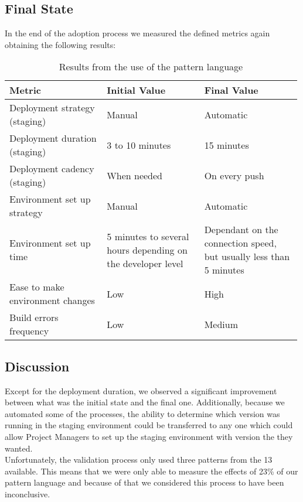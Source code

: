 			\subsection{Final State}
			In the end of the adoption process we measured the defined metrics again obtaining the following results:
			\begin{table}[h!]
				\begin{center}
					\begin{tabular}{| p{0.33\linewidth} | p{0.33\linewidth} | p{0.33\linewidth} |}
						\hline
	 					\textbf{Metric} & \textbf{Initial Value} & \textbf{Final Value}                     \\ \hline
	 					Deployment strategy (staging) 	    & Manual            & Automatic                 \\ \hline
						Deployment duration (staging) 	    & 3 to 10 minutes   & 15 minutes                \\ \hline
						Deployment cadency (staging)  	    & When needed       & On every push             \\ \hline
						Environment set up strategy		    & Manual            & Automatic                 \\ \hline
						Environment set up time 			& 5 minutes to several hours depending on the developer level  & Dependant on the connection speed, but usually less than 5 minutes  \\ \hline
						Ease to make environment changes    & Low               & High                      \\ \hline
						Build errors frequency			    & Low               & Medium                    \\ \hline
					\end{tabular}
				\end{center}
				\caption{Results from the use of the pattern language}
				\subsection{Discussion}
				Except for the deployment duration, we observed a significant improvement between what was the initial state and the final one. Additionally, because we automated some of the processes, the ability to determine which version was running in the staging environment could be transferred to any one which could allow Project Managers to set up the staging environment with version the they wanted. \\
				Unfortunately, the validation process only used three patterns from the 13 available. This means that we were only able to measure the effects of 23\% of our pattern language and because of that we considered this process to have been inconclusive.
			\end{table}
